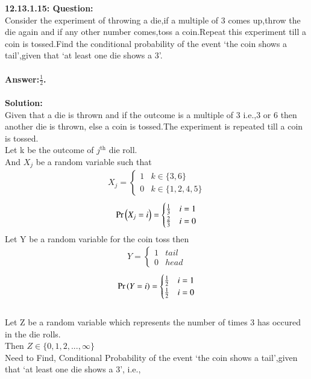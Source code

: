 \documentclass[journal,12pt,twocolumn]{IEEEtran}
\begin{document}
\textbf{12.13.1.15: Question:}\\
 	Consider the experiment of throwing a die,if a multiple of 3 comes up,throw the die again and if any other number comes,toss a coin.Repeat this experiment till a coin is tossed.Find the conditional probability of the event `the coin shows a tail',given that `at least one die shows a 3'.
\\\\
 \textbf{Answer:$\frac{1}{2}$.}\\
 \\
 \textbf{Solution:}
 \\
 Given that a die is thrown and if the outcome is a multiple of 3 i.e.,3 or 6 then another die is thrown, else a coin is tossed.The experiment is repeated till a coin is tossed.
 \\ Let k be the outcome of $j^{\text{th}}$ die roll.
\\ And $X_j$ be a random variable such that
\begin{align}
        X_j=  
        \begin{cases}
            1 & k \in \{3,6\} \\
            0 & k \in \{1,2,4,5\}
        \end{cases}
        \label{eq:ncert/12/13/1/15/pmf-X}
    \end{align}
\begin{align}
        \Pr\left(X_j=i\right) = 
        \begin{cases}
            \frac{1}{3} & i=1 \\
            \frac{2}{3} & i=0
        \end{cases}
        \label{eq:ncert/12/13/1/15/pmf-X}
    \end{align}
Let Y be a random variable for the coin toss then
\begin{align}
        Y=  
        \begin{cases}
            1 & tail \\
            0 & head
        \end{cases}
        \label{eq:ncert/12/13/1/15/pmf-X}
    \end{align}
\begin{align}
        \Pr\left(Y=i\right) = 
        \begin{cases}
            \frac{1}{2} & i=1 \\
            \frac{1}{2} & i=0
        \end{cases}
        \label{eq:ncert/12/13/1/15/pmf-X}
    \end{align} 
\\Let Z be a random variable which represents the number of times 3 has occured in the die rolls.
\\Then $Z \in \{0,1,2,...,\infty\} $
\\ Need to Find, Conditional Probability of the event `the coin shows a tail',given that `at least one die shows a 3', i.e., 
\end{document}
